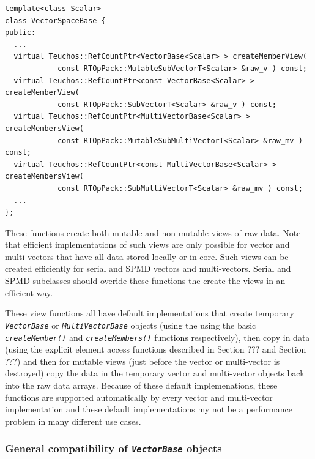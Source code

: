 \documentclass[pdf,ps2pdf,11pt]{SANDreport}
\begin{document}
{\scriptsize\begin{verbatim}
template<class Scalar>
class VectorSpaceBase {
public:
  ...
  virtual Teuchos::RefCountPtr<VectorBase<Scalar> > createMemberView(
            const RTOpPack::MutableSubVectorT<Scalar> &raw_v ) const;
  virtual Teuchos::RefCountPtr<const VectorBase<Scalar> > createMemberView(
            const RTOpPack::SubVectorT<Scalar> &raw_v ) const;
  virtual Teuchos::RefCountPtr<MultiVectorBase<Scalar> > createMembersView(
            const RTOpPack::MutableSubMultiVectorT<Scalar> &raw_mv ) const;
  virtual Teuchos::RefCountPtr<const MultiVectorBase<Scalar> > createMembersView(
            const RTOpPack::SubMultiVectorT<Scalar> &raw_mv ) const;
  ...
};
\end{verbatim}}

These functions create both mutable and non-mutable views of raw data.
Note that efficient implementations of such views are only possible
for vector and multi-vectors that have all data stored locally or
in-core.  Such views can be created efficiently for serial and SPMD
vectors and multi-vectors.  Serial and SPMD subclasses should overide
these functions the create the views in an efficient way.

These view functions all have default implementations that create temporary
{}\texttt{\textit{Vector\-Base}} or {}\texttt{\textit{Multi\-Vector\-Base}}
objects (using the using the basic {}\texttt{\textit{create\-Member()}} and
{}\texttt{\textit{create\-Members()}} functions respectively), then copy in
data (using the explicit element access functions described in Section ??? and
Section ???) and then for mutable views (just before the vector or
multi-vector is destroyed) copy the data in the temporary vector and
multi-vector objects back into the raw data arrays.  Because of these default
implemenations, these functions are supported automatically by every vector
and multi-vector implementation and these default implementations my not be a
performance problem in many different use cases.

%
\subsubsection{General compatibility of {}\texttt{\textit{Vector\-Base}} objects}
\label{tsfcore:sec:vec_spc_compatibility}
%
\end{document}
